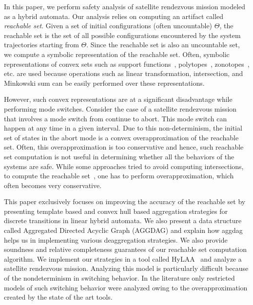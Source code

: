 In this paper, we perform safety analysis of satellite rendezvous mission modeled as a hybrid automata.
%
Our analysis relies on computing an artifact called {\em reachable set}. 
%
Given a set of initial configurations (often uncountable) $\Theta$, the reachable set is the set of all possible configurations encountered by the system trajectories starting from $\Theta$. 
%
Since the reachable set is also an uncountable set, we compute a symbolic representation of the reachable set.
%
Often, symbolic representations of convex sets such as support functions~\cite{spaceex}, polytopes~\cite{Frehse05_phaver}, zonotopes~\cite{girard2006efficient}, etc. are used because operations such as linear transformation, intersection, and Minkowski sum can be easily performed over these representations.
%


However, such convex representations are at a significant disadvantage while performing mode switches.
%
Consider the case of a satellite rendezvous mission that involves a mode switch from continue to abort.
%
This mode switch can happen at any time in a given interval. 
%
Due to this non-determinism, the initial set of states in the abort mode is a convex overapproximation of the reachable set. 
%
Often, this overapproximation is too conservative and hence, such reachable set computation is not useful in determining whether all the behaviors of the systems are safe. 
%
While some approaches tried to avoid computing intersections, to compute the reachable set~\cite{althoff2012avoiding}, one has to perform overapproximation, which often becomes very conservative.
%

This paper exclusively focuses on improving the accuracy of the reachable set by presenting template based and convex hull based aggregation strategies for discrete transitions in linear hybrid automata.
%
We also present a data structure called Aggregated Directed Acyclic Graph (AGGDAG) and explain how aggdag helps us in implementing various deaggregation strategies. 
%
%
We also provide soundness and relative completeness guarantees of our reachable set computation algorithm.
%
We implement our strategies in a tool called HyLAA~\cite{bak2017hscc} and analyze a satellite rendezvous mission.
%
Analyzing this model is particularly difficult because of the nondeterminism in switching behavior.
%
In the literature only restricted models of such switching behavior were analyzed owing to the overapproximation created by the state of the art tools.



